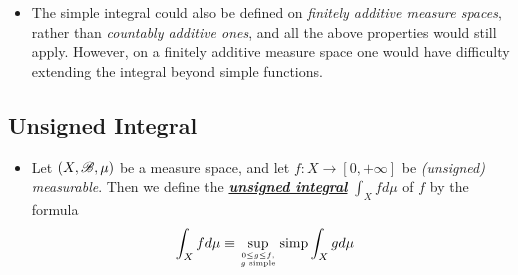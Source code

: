 \documentclass[11pt]{article}
\begin{document}
\begin{itemize}
\item \begin{remark}
The simple integral could also be defined on \emph{finitely additive measure spaces}, rather than \emph{countably additive ones}, and all the above properties would still apply. However, on a finitely additive measure space one would have difficulty extending the integral beyond simple functions.
\end{remark}
\end{itemize}

\subsection{Unsigned Integral}
\begin{itemize}
\item \begin{definition}
Let $(X,{\mathscr B}, \mu)$ be a measure space, and let $f : X\rightarrow  [0,+\infty]$ be \emph{(unsigned) measurable}. Then we define the \underline{\emph{\textbf{unsigned integral}}} $\int_X f d\mu$ of $f$ by the formula
\begin{align*}
\int_{X}f d\mu &\equiv \sup\limits_{0\le g\le f, \atop g \text{ simple}} \text{simp}\int_{X}g d\mu
\end{align*}
\end{definition}


\end{itemize}
\end{document}
